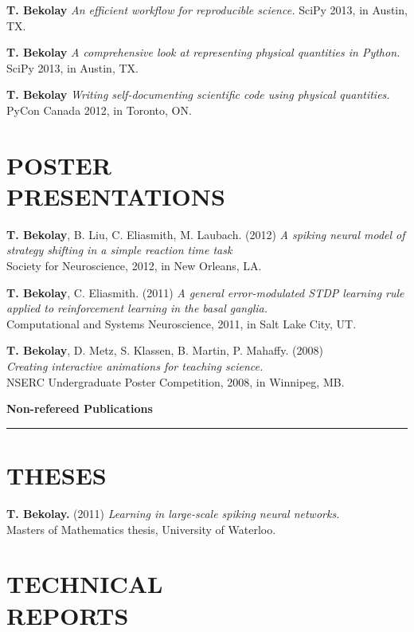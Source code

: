 \documentclass[line,margin]{res}
\begin{document}
\begin{resume}
\textbf{T. Bekolay} {\sl An efficient workflow for reproducible science.}
  SciPy 2013, in Austin, TX.

\textbf{T. Bekolay}
  {\sl A comprehensive look at representing physical quantities in Python.}
  SciPy 2013, in Austin, TX.

\textbf{T. Bekolay}
  {\sl Writing self-documenting scientific code using physical quantities.}
  PyCon Canada 2012, in Toronto, ON.

\section{POSTER \\PRESENTATIONS}

\textbf{T. Bekolay}, B. Liu, C. Eliasmith, M. Laubach. (2012)
  {\sl A spiking neural model of strategy shifting in a simple
  reaction time task} \\
  Society for Neuroscience, 2012, in New Orleans, LA.

\textbf{T. Bekolay}, C. Eliasmith. (2011)
  {\sl A general error-modulated STDP learning rule applied to
  reinforcement learning in the basal ganglia.} \\
  Computational and Systems Neuroscience, 2011, in Salt Lake City, UT.

\textbf{T. Bekolay}, D. Metz, S. Klassen, B. Martin, P. Mahaffy. (2008) \\
  {\sl Creating interactive animations for teaching science.} \\
  NSERC Undergraduate Poster Competition, 2008, in Winnipeg, MB.
  \vspace{0.42em}

{\Large \bf Non-refereed Publications} \\ \vspace{-8pt} \hrule

\section{THESES}

\textbf{T. Bekolay.} (2011)
  {\sl Learning in large-scale spiking neural networks.} \\
  Masters of Mathematics thesis, University of Waterloo.

\section{TECHNICAL \\REPORTS}


\end{resume}
\end{document}

